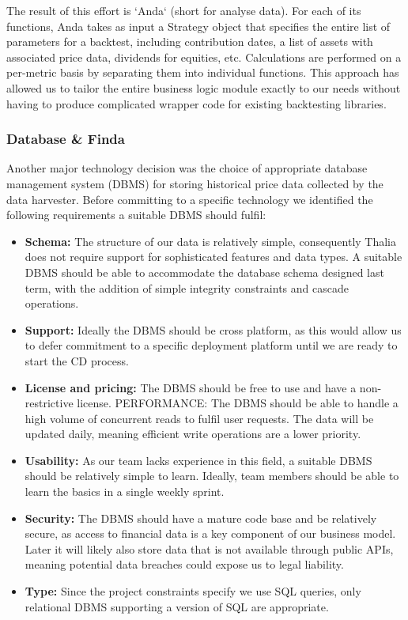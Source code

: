 The result of this effort is `Anda` (short for analyse data). For each of its functions, Anda takes as input a Strategy object that specifies the entire list of parameters for a backtest, including contribution dates, a list of assets with associated price data, dividends for equities, etc. Calculations are performed on a per-metric basis by separating them into individual functions.
This approach has allowed us to tailor the entire business logic module exactly to our needs without having to produce complicated wrapper code for existing backtesting libraries.

\subsubsection{Database \& Finda}
\label{Finda}

Another major technology decision was the choice of appropriate database management system (DBMS) for storing historical price data collected by the data harvester. Before committing to a specific technology we identified the following requirements a suitable DBMS should fulfil:

\begin {itemize}
\item \textbf{Schema:} The structure of our data is relatively simple, consequently Thalia does not require support for sophisticated features and data types. A suitable DBMS should be able to accommodate the database schema designed last term, with the addition of simple integrity constraints and cascade operations.
\item \textbf{Support:} Ideally the DBMS should be cross platform, as this would allow us to defer commitment to a specific deployment platform until we are ready to start the CD process. 
\item \textbf{License and pricing:} The DBMS should be free to use and have a non-restrictive license.
PERFORMANCE: The DBMS should be able to handle a high volume of concurrent reads to fulfil user requests. The data will be updated daily, meaning efficient write operations are a lower priority.
\item \textbf{Usability:} As our team lacks experience in this field, a suitable DBMS should be relatively simple to learn. Ideally, team members should be able to learn the basics in a single weekly sprint.
\item \textbf{Security:} The DBMS should have a mature code base and be relatively secure, as access to financial data is a key component of our business model. Later it will likely also store data that is not available through public APIs, meaning potential data breaches could expose us to legal liability. \cite{dataprotectionGov}
\item \textbf{Type:} Since the project constraints specify we use SQL queries, only relational DBMS supporting a version of SQL are appropriate.

\end{itemize}

